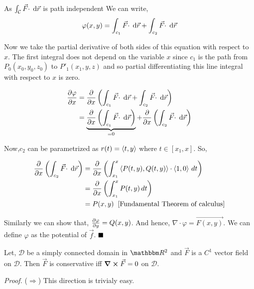 \documentclass[../Analysis-3]{subfiles}
\begin{document}
As $\int_{\mathcal{C}} {\vec{F} \cdot } \hspace{0.1cm} \dd {\vec{r}}$ is path independent We can write, \[
    \varphi(x,y) = \int_{c_1} {\vec{F} \cdot } \hspace{0.1cm} \dd {\vec{r}} + \int_{c_2} {\vec{F} \cdot } \hspace{0.1cm} \dd {\vec{r}}
\]

Now we take the partial derivative of both sides of this equation with respect to $x$. The first integral does not depend on the variable $x$ since $c_1$ is the path from $P_0(x_0,y_0,z_0)$ to $P'_1(x_1,y,z)$ and so partial differentiating this line integral with respect to $x$ is zero.

\begin{align*}
    \pdv{\varphi}{x} & =\pdv{x} \left( \int_{c_1} {\vec{F} \cdot } \hspace{0.1cm} \dd {\vec{r}} + \int_{c_2} {\vec{F} \cdot } \hspace{0.1cm} \dd {\vec{r}} \right)                                           \\
                     & = \underbrace{\pdv{x} \left( \int_{c_1} {\vec{F} \cdot } \hspace{0.1cm} \dd {\vec{r}}\right)}_{= 0}  + \pdv{x} \left(\int_{c_2} {\vec{F} \cdot } \hspace{0.1cm} \dd {\vec{r}} \right)
\end{align*}

Now,$c_2$ can be parametrized as $r(t) = \left\langle {t}, {y} \right\rangle$ where $t \in [x_1,x]$. So,

\begin{align*}
    \pdv{x} \left(\int_{c_2} {\vec{F} \cdot } \hspace{0.1cm} \dd {\vec{r}}\right) & = \pdv{x} \left( \int_{x_1}^x \left\langle {P(t,y)}, {Q(t,y)} \right\rangle \cdot \left\langle {1}, {0} \right\rangle \,d t \right) \\
                                                             & = \pdv{x} \left( \int_{x_1}^x P(t,y) \,d t \right)                                \\
                                                             & = P(x,y) \hspace{0.2cm} \text{[Fundamental Theorem of calculus]}
\end{align*}

Similarly we can show that, $\pdv{\varphi}{y} = Q(x,y)$. And hence,  $ \nabla \cdot \varphi = \vec{F(x,y)}$. We can define $\varphi$ as the potential of $\vec{f}$. $\hfill \blacksquare$

\begin{Thm}{}{}
    Let, $\mathcal{D}$ be a simply connected domain in $\R^2$ and $\vec{F}$ is a $C^1$ vector field on $\mathcal{D}$. Then $\vec{F}$ is conservative iff $\curl \vec{F} = 0$ on $\mathcal{D}$.
\end{Thm}

\textit{Proof.} ($\Rightarrow$) This direction is trivialy easy.

\vspace{0.2cm}
\end{document}
